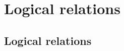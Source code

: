 \documentclass[draft,11pt]{report}
\begin{document}

%
%
%
%
%




\section{Logical relations} %

\subsection{Logical relations} \label{sec:logrel} %
\end{document}
